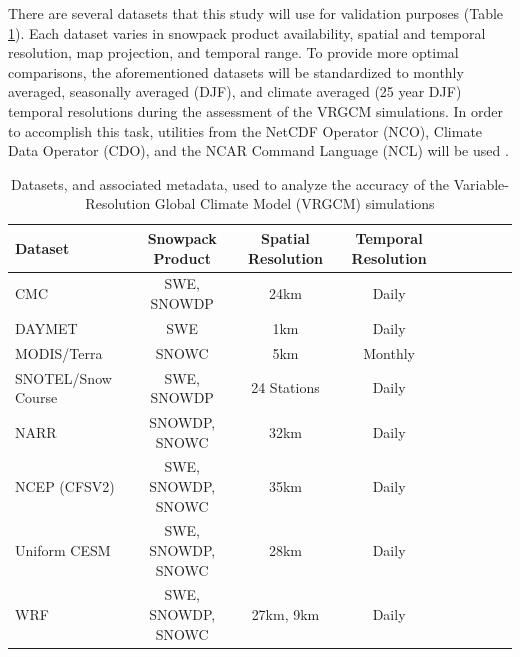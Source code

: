 \documentclass[11pt]{article}
\begin{document}
There are several datasets that this study will use for validation purposes (Table \ref{t1}).  Each dataset varies in snowpack product availability, spatial and temporal resolution, map projection, and temporal range.  To provide more optimal comparisons, the aforementioned datasets will be standardized to monthly averaged, seasonally averaged (DJF), and climate averaged (25 year DJF) temporal resolutions during the assessment of the VRGCM simulations.  In order to accomplish this task, utilities from the NetCDF Operator (NCO), Climate Data Operator (CDO), and the NCAR Command Language (NCL) will be used \citep{schulzweida2007cdo,zender2006netcdf}.  

\begin{table}[t]
\caption{Datasets, and associated metadata, used to analyze the accuracy of the Variable-Resolution Global Climate Model (VRGCM) simulations}\label{t1}
\begin{center}
\begin{tabular*}{\textwidth}{@{\extracolsep\fill}lcccccccc}
\hline
Dataset & Snowpack  Product & Spatial  Resolution & Temporal Resolution \\
\hline
 CMC & SWE, SNOWDP & 24km & Daily\\
 DAYMET & SWE & 1km & Daily \\
 MODIS/Terra & SNOWC & 5km & Monthly \\
 SNOTEL/Snow Course & SWE, SNOWDP & 24 Stations & Daily \\
 NARR & SNOWDP, SNOWC & 32km & Daily \\
 NCEP (CFSV2) & SWE, SNOWDP, SNOWC & 35km & Daily \\
\hline
 Uniform CESM & SWE, SNOWDP, SNOWC & 28km & Daily \\
 WRF & SWE, SNOWDP, SNOWC & 27km, 9km & Daily \\
\hline
\end{tabular*}
\end{center}
\end{table}
\end{document}
